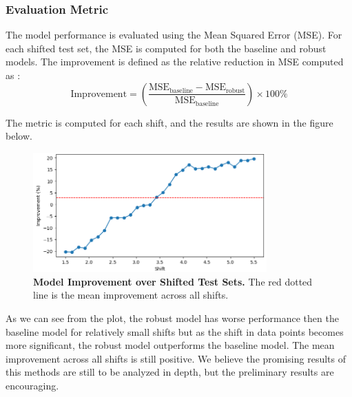 \subsubsection{Evaluation Metric}
The model performance is evaluated using the Mean Squared Error (MSE). For each shifted test set, the MSE is computed for both the baseline and robust models.
The improvement is defined as the relative reduction in MSE computed as :
\begin{equation}
    \text{Improvement} = \left(\frac{\text{MSE}_{\text{baseline}} - \text{MSE}_{\text{robust}}}{\text{MSE}_{\text{baseline}}}\right) \times 100\%
\end{equation}

The metric is computed for each shift, and the results are shown in the figure below.
\begin{figure}[H]
    \centering
    \includegraphics[width=0.8\textwidth]{assets/reg_exp_improvement.png} 
    \caption{\textbf{Model Improvement over Shifted Test Sets.} The red dotted line is the mean improvement across all shifts.}
    \label{fig:improv-plot}
\end{figure}

As we can see from the plot, the robust model has worse performance then the baseline model for relatively small shifts but as the shift in data points becomes more significant, the robust model outperforms the baseline model. The mean improvement across all shifts is still positive.
We believe the promising results of this methods are still to be analyzed in depth, but the preliminary results are encouraging.
